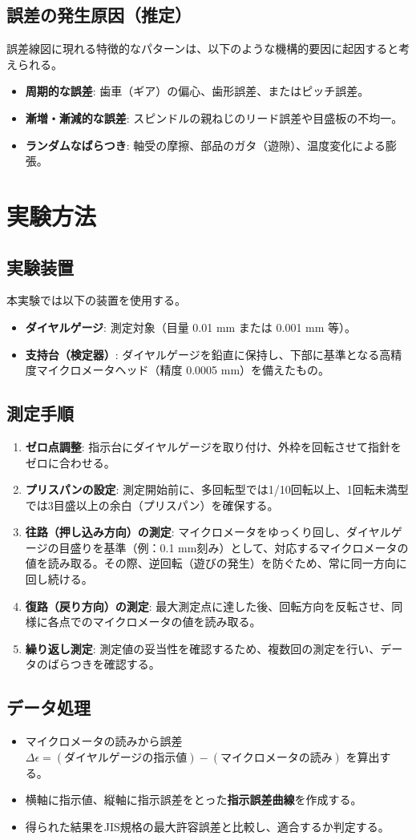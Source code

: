 \documentclass[10pt,a4paper,titlepage]{jreport} %
\begin{document}
\section{誤差の発生原因（推定）}
誤差線図に現れる特徴的なパターンは、以下のような機構的要因に起因すると考えられる。
\begin{itemize}
    \item \textbf{周期的な誤差}: 歯車（ギア）の偏心、歯形誤差、またはピッチ誤差。
    \item \textbf{漸増・漸減的な誤差}: スピンドルの親ねじのリード誤差や目盛板の不均一。
    \item \textbf{ランダムなばらつき}: 軸受の摩擦、部品のガタ（遊隙）、温度変化による膨張。
\end{itemize}

\chapter{実験方法}
\section{実験装置}
本実験では以下の装置を使用する。
\begin{itemize}
    \item \textbf{ダイヤルゲージ}: 測定対象（目量 0.01 mm または 0.001 mm 等）。
    \item \textbf{支持台（検定器）}: ダイヤルゲージを鉛直に保持し、下部に基準となる高精度マイクロメータヘッド（精度 0.0005 mm）を備えたもの。
\end{itemize}

\section{測定手順}
\begin{enumerate}
    \item \textbf{ゼロ点調整}: 指示台にダイヤルゲージを取り付け、外枠を回転させて指針をゼロに合わせる。
    \item \textbf{プリスパンの設定}: 測定開始前に、多回転型では1/10回転以上、1回転未満型では3目盛以上の余白（プリスパン）を確保する。
    \item \textbf{往路（押し込み方向）の測定}: マイクロメータをゆっくり回し、ダイヤルゲージの目盛りを基準（例：0.1 mm刻み）として、対応するマイクロメータの値を読み取る。その際、逆回転（遊びの発生）を防ぐため、常に同一方向に回し続ける。
    \item \textbf{復路（戻り方向）の測定}: 最大測定点に達した後、回転方向を反転させ、同様に各点でのマイクロメータの値を読み取る。
    \item \textbf{繰り返し測定}: 測定値の妥当性を確認するため、複数回の測定を行い、データのばらつきを確認する。
\end{enumerate}

\section{データ処理}
\begin{itemize}
    \item マイクロメータの読みから誤差 $\Delta \epsilon = (\text{ダイヤルゲージの指示値}) - (\text{マイクロメータの読み})$ を算出する。
    \item 横軸に指示値、縦軸に指示誤差をとった\textbf{指示誤差曲線}を作成する。
    \item 得られた結果をJIS規格の最大許容誤差と比較し、適合するか判定する。
\end{itemize}
\end{document}
